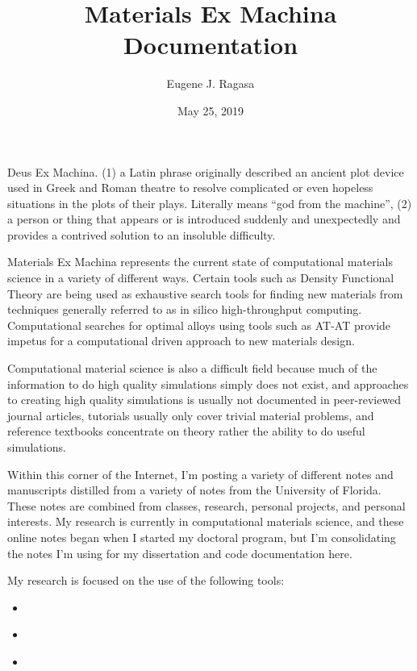 \documentclass[letterpaper,10pt,english]{sphinxmanual}
\title{Materials Ex Machina Documentation}
\date{May 25, 2019}
\author{Eugene J. Ragasa}
\begin{document}
\maketitle
\sphinxtableofcontents
{}\label{\detokenize{index::doc}}


Deus Ex Machina. (1) a Latin phrase originally described an ancient plot device used in Greek and Roman theatre to resolve complicated or even hopeless situations in the plots of their plays. Literally means “god from the machine”, (2) a person or thing that appears or is introduced suddenly and unexpectedly and provides a contrived solution to an insoluble difficulty.

Materials Ex Machina represents the current state of computational materials science in a variety of different ways.  Certain tools such as Density Functional Theory are being used as exhaustive search tools for finding new materials from techniques generally referred to as in silico high-throughput computing.  Computational searches for optimal alloys using tools such as AT-AT provide impetus for a computational driven approach to new materials design.

Computational material science is also a difficult field because much of the information to do high quality simulations simply does not exist, and approaches to creating high quality simulations is usually not documented in peer-reviewed journal articles, tutorials usually only cover trivial material problems, and reference textbooks concentrate on theory rather the ability to do useful simulations.

Within this corner of the Internet, I’m posting a variety of different notes and manuscripts distilled from a variety of notes from the University of Florida.  These notes are combined from classes, research, personal projects, and personal interests.  My research is currently in computational materials science, and these online notes began when I started my doctoral program, but I’m consolidating the notes I’m using for my dissertation and code documentation here.

My research is focused on the use of the following tools:
\begin{itemize}
\item {} 
{\hyperref[\detokenize{dft/index:dft}]{}}

\item {} 
{\hyperref[\detokenize{md/index:md}]{}}

\item {} 
{\hyperref[\detokenize{ld/index:ld}]{}}

\end{itemize}
\end{document}
